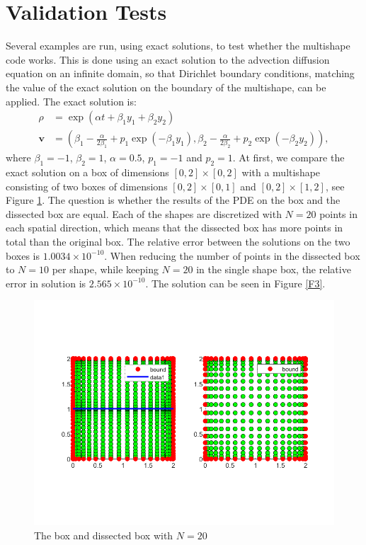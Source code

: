 \documentclass[11pt, a4paper]{article}
\theoremstyle{definition}
\begin{document}
\section{Validation Tests}
Several examples are run, using exact solutions, to test whether the multishape code works. This is done using an exact solution to the advection diffusion equation on an infinite domain, so that Dirichlet boundary conditions, matching the value of the exact solution on the boundary of the multishape, can be applied.
The exact solution is:
\begin{align*}
	\rho &= \exp(\alpha t + \beta_1 y_1 + \beta_2 y_2)\\
	\mathbf v &= \left(\beta_1 - \frac{\alpha}{2 \beta_1} + p_1\exp(-\beta_1 y_1) , \beta_2 - \frac{\alpha}{2 \beta_2} + p_2\exp(-\beta_2 y_2) \right),
\end{align*}
where $\beta_1 = -1$, $\beta_2 = 1$, $\alpha = 0.5$, $p_1 = -1$ and $p_2 = 1$.
At first, we compare the exact solution on a box of dimensions $[0,2] \times [0,2] $ with a multishape consisting of two boxes of dimensions $[0,2] \times [0,1]$ and $[0,2] \times [1,2]$, see Figure \ref{F2}. The question is whether the results of the PDE on the box and the dissected box are equal. Each of the shapes are discretized with $N = 20$ points in each spatial direction, which means that the dissected box has more points in total than the original box.
The relative error between the solutions on the two boxes is $1.0034 \times 10^{-10}$. 
When reducing the number of points in the dissected box to $N = 10$ per shape, while keeping $N = 20$ in the single shape box, the relative error in solution is $2.565 \times 10^{-10}$. The solution can be seen in Figure \ref{F3}.

	\begin{figure}[h]
		\centering
		\includegraphics[scale=0.5]{disect1.png}
		\caption{The box and dissected box with $N = 20$} 
		\label{F2}
	\end{figure}
\end{document}
